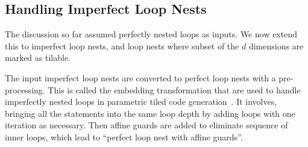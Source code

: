 %
%

\subsection{Handling Imperfect Loop Nests}
\label{sec:codegen_ext}
The discussion so far assumed perfectly nested loops as inputs.  We now extend
this to imperfect loop nests, and loop nests where subset of the $d$
dimensions are marked as tilable.

The input imperfect loop nests are converted to perfect loop nests with a
pre-processing.  This is called the embedding transformation that are used to
handle imperfectly nested loops in parametric tiled code
generation~\cite{sanjay-kim-dtilingTR-2010}. 
It involves, bringing all the statements into the same loop depth by adding
loops with one iteration as necessary. Then affine guards are added to
eliminate sequence of inner loops, which lead to ``perfect loop nest with
affine guards''.


